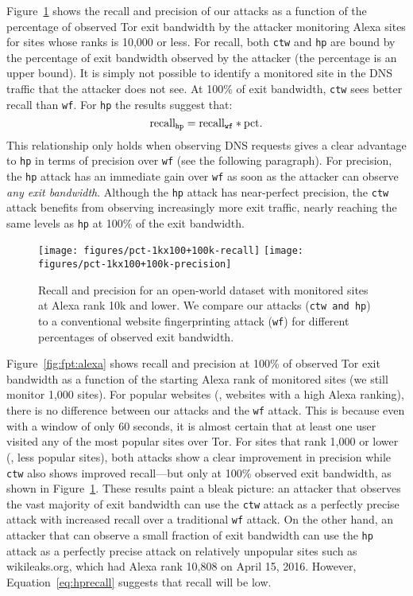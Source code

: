 Figure~\ref{fig:fpt:torpct} shows the recall and precision of our \name
attacks as a function of the percentage of observed Tor exit bandwidth by the
attacker monitoring Alexa sites for sites whose ranks is 10,000 or less.
For recall, both \texttt{ctw} and \texttt{hp} are bound by the
percentage of exit bandwidth observed by the attacker (the percentage is an
upper bound).
It is simply not possible to identify a monitored site in the DNS traffic that
the attacker does not see. At 100\% of exit bandwidth, \texttt{ctw} sees
better recall than \texttt{wf}. For \texttt{hp} the results suggest that:
\begin{equation}
	\label{eq:hprecall}
	\textnormal{recall}_{\texttt{hp}} = \textnormal{recall}_{\texttt{wf}} * \textnormal{pct}.
\end{equation}
This relationship only holds when observing DNS requests gives
a clear advantage to \texttt{hp} in terms of precision over \texttt{wf} (see
the following paragraph).
For precision, the \texttt{hp} attack has an immediate gain over \texttt{wf} as
soon as the attacker can observe {\it any exit bandwidth}.
Although the \texttt{hp} attack has near-perfect precision, the
\texttt{ctw} attack benefits from observing increasingly more exit traffic,
nearly reaching the same levels as \texttt{hp} at 100\% of the exit bandwidth.


\begin{figure}[t]
\centering
\texttt{[image: figures/pct-1kx100+100k-recall]}
\texttt{[image: figures/pct-1kx100+100k-precision]}
\caption{Recall and precision for an open-world dataset with monitored sites
at Alexa rank 10k and lower. We compare our \name attacks (\texttt{ctw and
 \texttt{hp}}) to a conventional website fingerprinting attack (\texttt{wf}) for different
 percentages of observed exit bandwidth. }
\label{fig:fpt:torpct}
\end{figure}


Figure~\ref{fig:fpt:alexa} shows recall and precision at 100\% of
observed Tor exit bandwidth as a function of the starting Alexa rank of
monitored sites (we still monitor 1,000 sites).
For popular websites (\ie, websites with a high Alexa ranking),
there is no difference between our attacks and the
\texttt{wf} attack. This is because even with a window of only 60 seconds,
it is almost certain that at least one user visited any of the most popular
sites over Tor. For sites that rank 1,000 or lower (\ie, less popular sites),
both \name attacks show a clear improvement in precision while
\texttt{ctw} also shows improved recall---but only at 100\% observed exit
bandwidth, as shown in Figure~\ref{fig:fpt:torpct}.
These results paint a bleak picture: an attacker that observes the
vast majority of exit bandwidth can use the \texttt{ctw} attack as a perfectly
precise attack with increased recall over a traditional \texttt{wf} attack.
On the other hand, an attacker that can observe a small fraction of exit
bandwidth can use the \texttt{hp} attack as a perfectly precise attack on
relatively {unpopular} sites such as wikileaks.org, which had Alexa rank 10,808
on April 15, 2016.  However, Equation~\ref{eq:hprecall} suggests that 
recall will be low.

